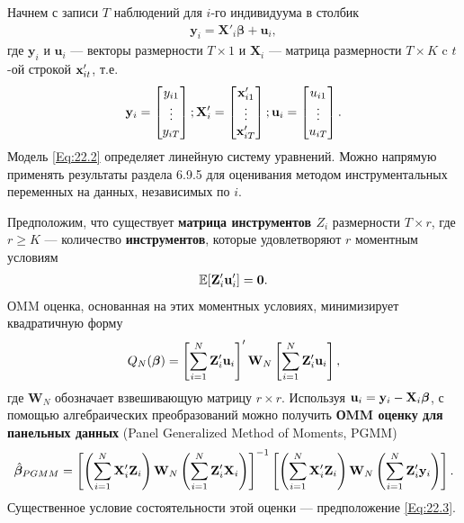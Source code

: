 Начнем с записи $T$ наблюдений для $i$-го индивидуума в столбик
\begin{align}
\mathbf y_{i}=\mathbf X'_{i}\bm\beta+\mathbf u_{i},
\label{Eq:22.2}
\end{align}
где $\mathbf y_i$ и $\mathbf u_i$ --- векторы размерности $T \times 1$ и $\mathbf X_i$ --- матрица размерности $T \times K$ c $t$-ой строкой $\mathbf{x}'_{it}$, т.е.
\begin{align}
\mathbf y_{i}=
\begin{bmatrix}
y_{i1} \\
\vdots \\
y_{iT}
\end{bmatrix};
\mathbf X'_{i}=
\begin{bmatrix}
\mathbf{x}'_{i1} \\
\vdots \\
\mathbf{x}'_{iT}
\end{bmatrix};
\mathbf u_i=
\begin{bmatrix}
u_{i1} \\
\vdots \\
u_{iT}
\end{bmatrix}.
\nonumber
\end{align}
Модель \ref{Eq:22.2} определяет линейную систему уравнений. Можно напрямую применять результаты раздела 6.9.5 для оценивания методом инструментальных переменных на данных, независимых по $i$.

Предположим, что существует \textbf{матрица инструментов $Z_i$} размерности $T \times r$, где $r \geq K$ --- количество \textbf{инструментов}, которые удовлетворяют $r$ моментным условиям
\begin{align}
\mathbb{E} [\mathbf Z'_i \mathbf u'_i]=\mathbf 0.
\label{Eq:22.3}
\end{align}
ОMM оценка, основанная на этих моментных условиях, минимизирует квадратичную форму
\begin{align}
Q_N(\bm{\beta})=\left[ \sum^N_{i=1} \mathbf Z'_i \mathbf u_i \right]'
\mathbf W_N
\left[ \sum^N_{i=1} \mathbf Z'_i \mathbf u_i \right],
\nonumber
\end{align}
где $\mathbf W_N$ обозначает взвешивающую матрицу $r \times r$. Используя $\mathbf u_i=\mathbf y_i - \mathbf X_i\bm{\beta}$, с помощью  алгебраических преобразований можно получить \textbf{ОMM оценку для панельных данных} (Panel Generalized Method of Moments, PGMM) 
\begin{align}
\hat{\bm{\beta}}_{PGMM}=
\left[ \left( \sum^N_{i=1} \mathbf X'_i \mathbf Z_i \right) \mathbf W_N
\left( \sum^N_{i=1} \mathbf Z'_i \mathbf X_i \right) \right]^{-1}
\left[ \left( \sum^N_{i=1} \mathbf X'_i \mathbf Z_i \right) \mathbf W_N
\left( \sum^N_{i=1} \mathbf Z'_i \mathbf y_i \right) \right].
\nonumber
\end{align}
Существенное условие состоятельности этой оценки --- предположение \ref{Eq:22.3}.

